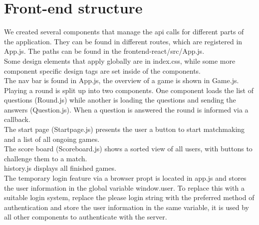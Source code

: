 \chapter{Front-end structure}
We created several components that manage the api calls for different parts of the application. They can be found in different routes, which are registered in App.js. The paths can be found in the frontend-react/src/App.js. \\
Some design elements that apply globally are in index.css, while some more component specific design tags are set inside of the components.\\

 The nav bar is found in App.js, the overview of a game is shown in Game.js. Playing a round is split up into two components. One component loads the list of questions (Round.js) while another is loading the questions and sending the answers (Question.js). When a question is answered the round is informed via a callback.\\
 The start page (Startpage.js) presents the user a button to start matchmaking and a list of all ongoing games.\\
 The score board (Scoreboard.js) shows a sorted view of all users, with buttons to challenge them to a match.\\
 history.js displays all finished games.\\
 The temporary login feature via a browser propt is located in app.js and stores the user information in the global variable window.user. To replace this with a suitable login system, replace the please login string with the preferred method of authentication and store the user information in the same variable, it is used by all other components to authenticate with the server.